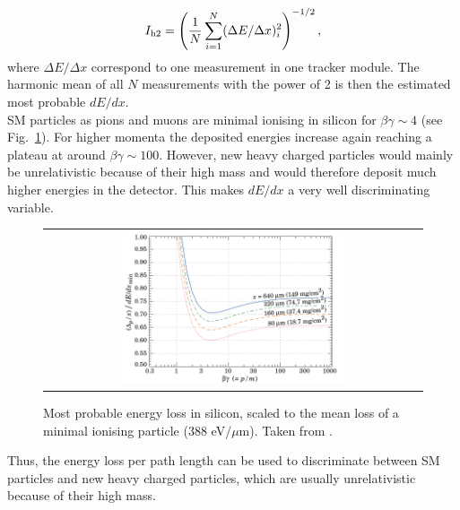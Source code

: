 \begin{equation}
I_{\text{h2}}=\left( \frac{1}{N}\sum_{i=1}^{N}(\Delta E/\Delta x)_i^2 \right)^{-1/2},
\label{eq:Harmonic2Estimator}
\end{equation}
where $\Delta E /\Delta x$ correspond to one measurement in one tracker module. 
The harmonic mean of all $N$ measurements with the power of 2 is then the estimated most probable $dE/dx$.\\

SM particles as pions and muons are minimal ionising in silicon for $\beta\gamma \sim 4$ (see Fig.~\ref{fig:dEdx_Landau_Silicon}). 
For higher momenta the deposited energies increase again reaching a plateau at around $\beta\gamma\sim100$. 
However, new heavy charged particles would mainly be unrelativistic because of their high mass and would therefore deposit much higher energies in the detector.
This makes $dE/dx$  a very well discriminating variable.
\begin{figure}[!bt]
  \centering 
  \begin{tabular}{c}
  \includegraphics[width=0.6\textwidth]{figures/analysis/dEdx_Landau_Silicon.png}
  \end{tabular}
  \caption{Most probable energy loss in silicon, scaled to the mean loss of a minimal ionising particle (388 eV/$\mu$m). Taken from \cite{bib:PDG_2014}.} 
  \label{fig:dEdx_Landau_Silicon}
\end{figure}
Thus, the energy loss per path length can be used to discriminate between SM particles and new heavy charged particles, which are usually unrelativistic because of their high mass.

